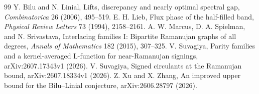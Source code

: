\documentclass[11pt]{article}
\begin{document}
\begin{thebibliography}{99}
 Y. Bilu and N. Linial, Lifts, discrepancy and nearly optimal spectral gap, \emph{Combinatorica} 26 (2006), 495--519.
 E. H. Lieb, Flux phase of the half-filled band, \emph{Physical Review Letters} 73 (1994), 2158--2161.
 A. W. Marcus, D. A. Spielman, and N. Srivastava, Interlacing families I: Bipartite Ramanujan graphs of all degrees, \emph{Annals of Mathematics} 182 (2015), 307--325.
 V. Suvagiya, Parity families and a kernel-averaged L-function for near-Ramanujan signings, arXiv:2607.17343v1 (2026).
 V. Suvagiya, Signed circulants at the Ramanujan bound, arXiv:2607.18334v1 (2026).
 Z. Xu and X. Zhang, An improved upper bound for the Bilu--Linial conjecture, arXiv:2606.28797 (2026).
\end{thebibliography}
\end{document}
